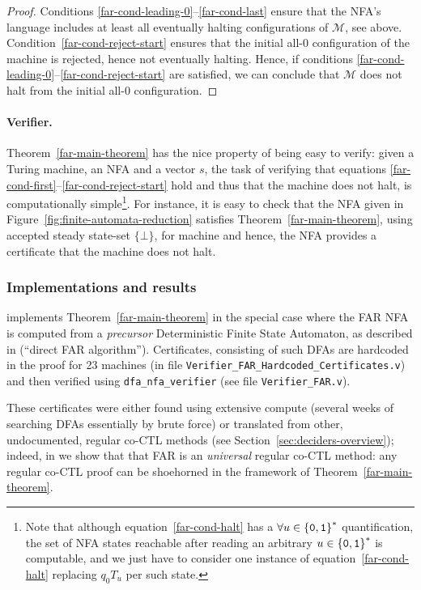 \begin{proof}
    Conditions \eqref{far-cond-leading-0}--\eqref{far-cond-last} ensure that the NFA's language includes at least all eventually halting configurations of $\mathcal{M}$, see above. Condition~\eqref{far-cond-reject-start} ensures that the initial all-0 configuration of the machine is rejected, hence not eventually halting. Hence, if conditions \eqref{far-cond-leading-0}--\eqref{far-cond-reject-start} are satisfied, we can conclude that $\mathcal{M}$ does not halt from the initial all-0 configuration.
\end{proof}

\paragraph{Verifier.} Theorem~\ref{far-main-theorem} has the nice property of being easy to verify: given a Turing machine, an NFA and a vector $s$, the task of verifying that equations \eqref{far-cond-first}--\eqref{far-cond-reject-start} hold and thus that the machine does not halt, is computationally simple\footnote{Note that although equation~\eqref{far-cond-halt} has a $\forall u\in\left\{\texttt{0},\texttt{1}\right\}^*$ quantification, the set of NFA states reachable after reading an arbitrary $u \in \left\{\texttt{0},\texttt{1}\right\}^*$ is computable, and we just have to consider one instance of equation~\eqref{far-cond-halt} replacing $q_0 T_u$ per such state.}. For instance, it is easy to check that the NFA given in Figure~\ref{fig:finite-automata-reduction} satisfies Theorem~\ref{far-main-theorem}, using accepted steady state-set $\{\bot\}$, for machine  and hence, the NFA provides a certificate that the machine does not halt.



\subsubsection{Implementations and results}\label{sec:FAR:results}

\CoqBB implements Theorem~\ref{far-main-theorem} in the special case where the FAR NFA is computed from a \textit{precursor} Deterministic Finite State Automaton, as described in \cite{bbchallenge_part1} (``direct FAR algorithm''). Certificates, consisting of such DFAs are hardcoded in the proof for 23 machines (in file \texttt{Verifier\_FAR\_Hardcoded\_Certificates.v}) and then verified using \texttt{dfa\_nfa\_verifier} (see file \texttt{Verifier\_FAR.v}).

These certificates were either found using extensive compute (\eg several weeks of searching DFAs essentially by brute force) or translated from other, undocumented, regular co-CTL methods (see Section~\ref{sec:deciders-overview}); indeed, in \cite{bbchallenge_part1} we show that that FAR is an \textit{universal} regular co-CTL method: any regular co-CTL proof can be shoehorned in the framework of Theorem~\ref{far-main-theorem}.

